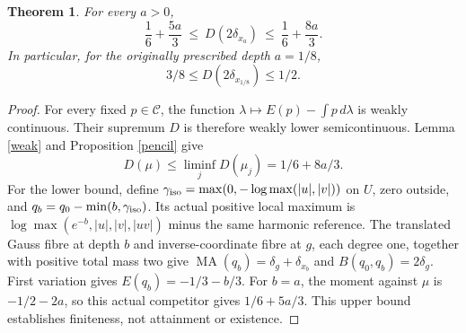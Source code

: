 \documentclass[11pt]{article}
\newtheorem{theorem}{Theorem}
\newcommand{\MA}{\operatorname{MA}}
\newcommand{\C}{\mathcal C}
\begin{document}
\begin{theorem}\label{bound}
For every $a>0$,
\[
 \frac16+\frac{5a}3\ \le\ D(2\delta_{x_a})\ \le\
 \frac16+\frac{8a}3.
\]
In particular, for the originally prescribed depth $a=1/8$,
\[
                         3/8\le D(2\delta_{x_{1/8}})\le1/2.
\]
\end{theorem}
\begin{proof}
For every fixed $p\in\C$, the function
$\lambda\mapsto E(p)-\int p\,d\lambda$ is weakly continuous.
Their supremum $D$ is therefore weakly lower semicontinuous. Lemma
\ref{weak} and Proposition \ref{pencil} give
\[
 D(\mu)\le\liminf_jD(\mu_j)=1/6+8a/3.
\]
For the lower bound, define
$\gamma_{\rm iso}=\max(0,-\log\max(|u|,|v|))$ on $U$, zero outside,
and $q_b=q_0-\min(b,\gamma_{\rm iso})$. Its actual positive local maximum
is $\log\max(e^{-b},|u|,|v|,|uv|)$ minus the same harmonic reference.
The translated Gauss fibre at depth $b$ and inverse-coordinate fibre at
$g$, each degree one, together with positive total mass two give
$\MA(q_b)=\delta_g+\delta_{x_b}$ and $B(q_0,q_b)=2\delta_g$.
First variation gives $E(q_b)=-1/3-b/3$. For $b=a$, the moment against
$\mu$ is $-1/2-2a$, so this actual competitor gives $1/6+5a/3$.
This upper bound establishes finiteness, not attainment or existence.
\end{proof}
\end{document}
